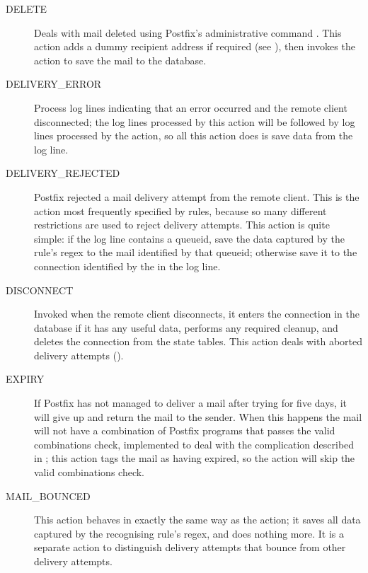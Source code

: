 \begin{description}
    \item [DELETE] Deals with mail deleted using Postfix's administrative
        command .  This action adds a dummy recipient
        address if required (see ), then invokes the  action to save the
        mail to the database.

    \item [DELIVERY\_ERROR] Process log lines indicating that an error
        occurred and the remote client disconnected; the log lines
        processed by this action will be followed by log lines processed by
        the  action, so all this action does is save
        data from the log line.

    \item [DELIVERY\_REJECTED] Postfix rejected a mail delivery attempt
        from the remote client.  This is the action most frequently
        specified by rules, because so many different restrictions are used
        to reject delivery attempts.  This action is quite simple: if the
        log line contains a queueid, save the data captured by the rule's
        regex to the mail identified by that queueid; otherwise save it to
        the connection identified by the  in the log line.

    \item [DISCONNECT] Invoked when the remote client disconnects, it
        enters the connection in the database if it has any useful data,
        performs any required cleanup, and deletes the connection from the
        state tables.  This action deals with aborted delivery attempts
        ().

    \item [EXPIRY] If Postfix has not managed to deliver a mail after
        trying for five days, it will give up and return the mail to the
        sender.  When this happens the mail will not have a combination of
        Postfix programs that passes the valid combinations check,
        implemented to deal with the complication described in
        ; this action tags the mail as
        having expired, so the  action will skip the valid
        combinations check.

    \item [MAIL\_BOUNCED] This action behaves in exactly the same way as
        the  action; it saves all data captured by the
        recognising rule's regex, and does nothing more.  It is a separate
        action to distinguish delivery attempts that bounce from other
        delivery attempts.


\end{description}
